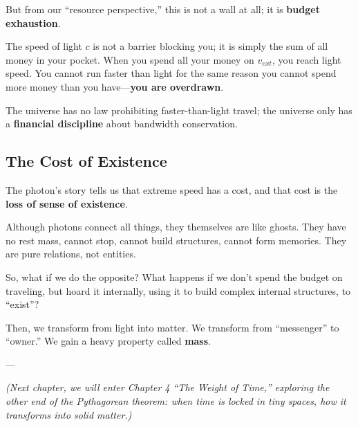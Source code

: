 But from our ``resource perspective,'' this is not a wall at all; it is \textbf{budget exhaustion}.

The speed of light $c$ is not a barrier blocking you; it is simply the sum of all money in your pocket. When you spend all your money on $v_{ext}$, you reach light speed. You cannot run faster than light for the same reason you cannot spend more money than you have---\textbf{you are overdrawn}.

The universe has no law prohibiting faster-than-light travel; the universe only has a \textbf{financial discipline} about bandwidth conservation.

\subsection{The Cost of Existence}

The photon's story tells us that extreme speed has a cost, and that cost is the \textbf{loss of sense of existence}.

Although photons connect all things, they themselves are like ghosts. They have no rest mass, cannot stop, cannot build structures, cannot form memories. They are pure relations, not entities.

So, what if we do the opposite? What happens if we don't spend the budget on traveling, but hoard it internally, using it to build complex internal structures, to ``exist''?

Then, we transform from light into matter. We transform from ``messenger'' to ``owner.'' We gain a heavy property called \textbf{mass}.

---

\textit{(Next chapter, we will enter Chapter 4 ``The Weight of Time,'' exploring the other end of the Pythagorean theorem: when time is locked in tiny spaces, how it transforms into solid matter.)}

